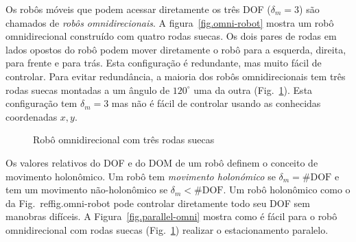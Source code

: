 {Os robôs móveis que podem acessar diretamente os três DOF ($\delta_m=3$) são chamados de \emph{robôs omnidirecionais}. A figura~\ref{fig.omni-robot} mostra um robô omnidirecional construído com quatro rodas suecas. Os dois pares de rodas em lados opostos do robô podem mover diretamente o robô para a esquerda, direita, para frente e para trás. Esta configuração é redundante, mas muito fácil de controlar. Para evitar redundância, a maioria dos robôs omnidirecionais tem três rodas suecas montadas a um ângulo de $120^\circ$ uma da outra (Fig.~\ref{fig.omni3}). Esta configuração tem $\delta_m=3$ mas não é fácil de controlar usando as conhecidas coordenadas $x,y$.

\begin{figure}
\begin{center}
\end{center}
\caption{Robô omnidirecional com três rodas suecas}\label{fig.omni3}
\end{figure}

Os valores relativos do DOF e do DOM de um robô definem o conceito de movimento holonômico. Um robô tem \emph{movimento holonómico} se $\delta_m = \#\textrm{DOF}$ e tem um movimento {não-holonômico} se $\delta_m < \#\textrm{DOF}$. Um robô holonômico como o da Fig.~ref{fig.omni-robot} pode controlar diretamente todo seu DOF sem manobras difíceis. A Figura~\ref{fig.parallel-omni} mostra como é fácil para o robô omnidirecional com rodas suecas (Fig.~\ref{fig.omni3}) realizar o estacionamento paralelo.

}
